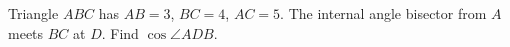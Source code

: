 Triangle $ABC$ has $AB=3$, $BC=4$, $AC=5$. The internal angle bisector from $A$ meets $BC$ at $D$. Find $\cos\angle ADB$.
